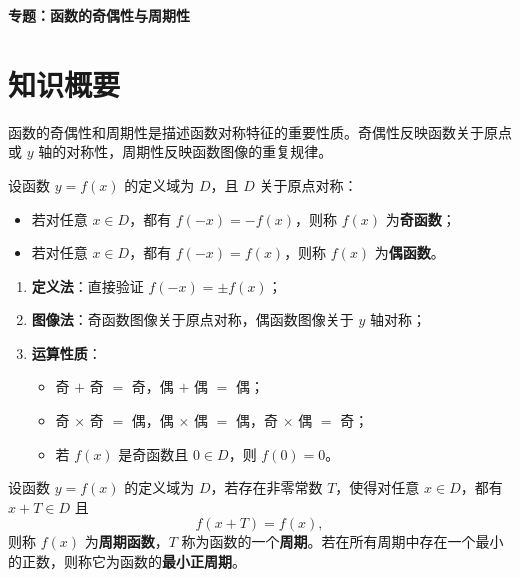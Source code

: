 \documentclass[11pt]{ctexrep}
\begin{document}
\begin{center}
    {\LARGE\bfseries 专题：函数的奇偶性与周期性}
\end{center}

\section*{知识概要}

函数的奇偶性和周期性是描述函数对称特征的重要性质。奇偶性反映函数关于原点或 $y$ 轴的对称性，周期性反映函数图像的重复规律。

\begin{definition}[奇函数与偶函数]
    设函数 $y = f(x)$ 的定义域为 $D$，且 $D$ 关于原点对称：
    \begin{itemize}
        \item 若对任意 $x \in D$，都有 $f(-x) = -f(x)$，则称 $f(x)$ 为\textbf{奇函数}；
        \item 若对任意 $x \in D$，都有 $f(-x) = f(x)$，则称 $f(x)$ 为\textbf{偶函数}。
    \end{itemize}
\end{definition}

\begin{property}[奇偶性的判定]
    \begin{enumerate}
        \item \textbf{定义法}：直接验证 $f(-x) = \pm f(x)$；
        \item \textbf{图像法}：奇函数图像关于原点对称，偶函数图像关于 $y$ 轴对称；
        \item \textbf{运算性质}：
        \begin{itemize}
            \item 奇 $+$ 奇 $=$ 奇，偶 $+$ 偶 $=$ 偶；
            \item 奇 $\times$ 奇 $=$ 偶，偶 $\times$ 偶 $=$ 偶，奇 $\times$ 偶 $=$ 奇；
            \item 若 $f(x)$ 是奇函数且 $0 \in D$，则 $f(0) = 0$。
        \end{itemize}
    \end{enumerate}
\end{property}

\begin{definition}[周期函数]
    设函数 $y = f(x)$ 的定义域为 $D$，若存在非零常数 $T$，使得对任意 $x \in D$，都有 $x+T \in D$ 且
    \[
        f(x+T) = f(x),
    \]
    则称 $f(x)$ 为\textbf{周期函数}，$T$ 称为函数的一个\textbf{周期}。若在所有周期中存在一个最小的正数，则称它为函数的\textbf{最小正周期}。
\end{definition}
\end{document}
